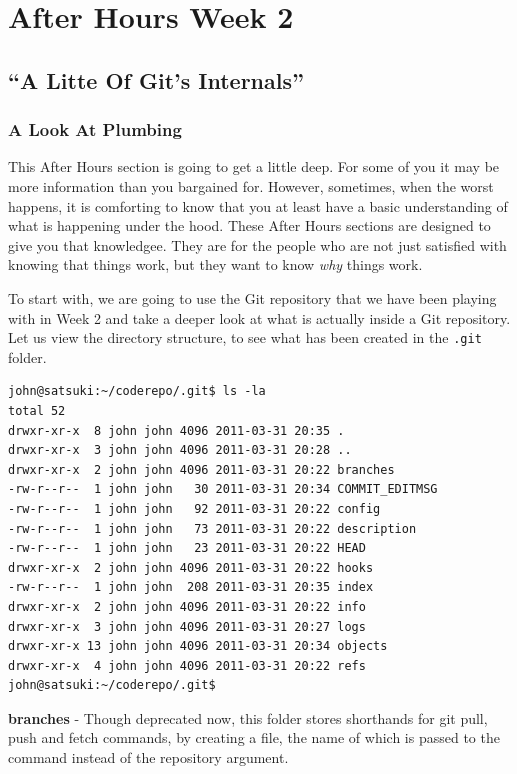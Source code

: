 \chapter{After Hours Week 2}
\section{``A Litte Of Git's Internals''}
\subsection{A Look At Plumbing}

This After Hours section is going to get a little deep.  For some of you it may be more information than you bargained for.  However, sometimes, when the worst happens, it is comforting to know that you at least have a basic understanding of what is happening under the hood.  These After Hours sections are designed to give you that knowledgee.  They are for the people who are not just satisfied with knowing that things work, but they want to know \emph{why} things work.

To start with, we are going to use the Git repository that we have been playing with in Week 2 and take a deeper look at what is actually inside a Git repository.  Let us view the directory structure, to see what has been created in the \texttt{.git} folder.

\begin{Verbatim}[frame=leftline,framerule=1mm,fontsize=\relsize{-3}] 
john@satsuki:~/coderepo/.git$ ls -la
total 52
drwxr-xr-x  8 john john 4096 2011-03-31 20:35 .
drwxr-xr-x  3 john john 4096 2011-03-31 20:28 ..
drwxr-xr-x  2 john john 4096 2011-03-31 20:22 branches
-rw-r--r--  1 john john   30 2011-03-31 20:34 COMMIT_EDITMSG
-rw-r--r--  1 john john   92 2011-03-31 20:22 config
-rw-r--r--  1 john john   73 2011-03-31 20:22 description
-rw-r--r--  1 john john   23 2011-03-31 20:22 HEAD
drwxr-xr-x  2 john john 4096 2011-03-31 20:22 hooks
-rw-r--r--  1 john john  208 2011-03-31 20:35 index
drwxr-xr-x  2 john john 4096 2011-03-31 20:22 info
drwxr-xr-x  3 john john 4096 2011-03-31 20:27 logs
drwxr-xr-x 13 john john 4096 2011-03-31 20:34 objects
drwxr-xr-x  4 john john 4096 2011-03-31 20:22 refs
john@satsuki:~/coderepo/.git$
\end{Verbatim}

\textbf{branches} - Though deprecated now, this folder stores shorthands for git pull, push and fetch commands, by creating a file, the name of which is passed to the command instead of the repository argument.

